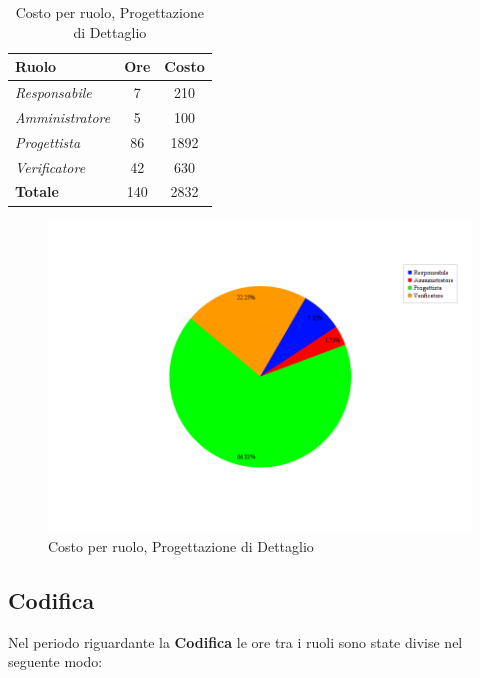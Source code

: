 \begin{table}[H]
	\begin{center}
		\begin{tabular}{|l|c|c|}
			\hline
			\textbf{Ruolo}	& \textbf{Ore} &	\textbf{Costo}	 \\
			\hline
			\textit{Responsabile}	&	7	&	210		\\
			\hline
			\textit{Amministratore}	&	5	&	100		\\
			\hline
			\textit{Progettista}		&	86	&	1892	\\
			\hline
			\textit{Verificatore}	&	42	&	630		\\
			\hline
			\textbf{Totale}	&	140	&	2832	\\
			\hline
		\end{tabular}
	\end{center}
	\caption{Costo per ruolo, Progettazione di Dettaglio}
\end{table}

\begin{figure}[H]
	\centering
	\includegraphics[scale=0.4]{immagini/Grafi/CostoPD}
	\caption{Costo per ruolo, Progettazione di Dettaglio}
\end{figure}


\subsection{Codifica}
Nel periodo riguardante la \textbf{Codifica} le ore tra i ruoli sono state divise nel seguente modo:

